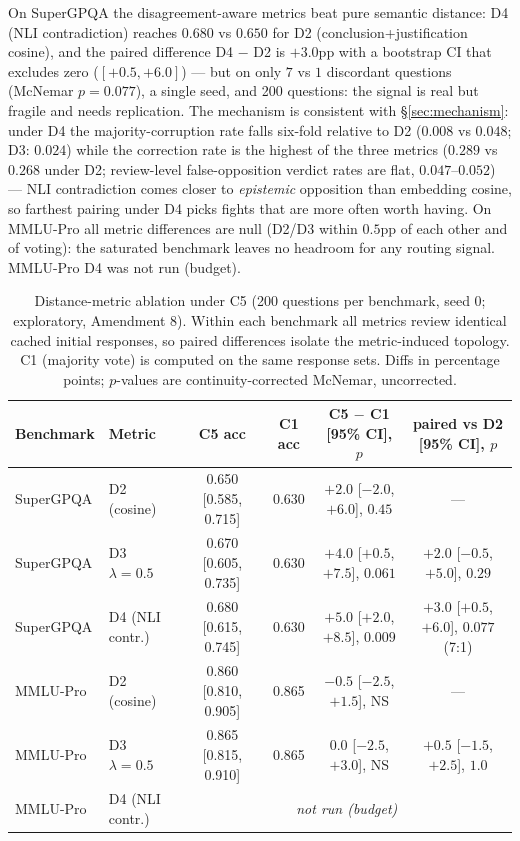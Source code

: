 \documentclass[11pt]{article}
\begin{document}
On SuperGPQA the disagreement-aware metrics beat pure semantic distance: D4 (NLI contradiction) reaches $0.680$ vs $0.650$ for D2 (conclusion+justification cosine), and the paired difference D4 $-$ D2 is $+3.0$pp with a bootstrap CI that excludes zero ($[+0.5, +6.0]$) --- but on only $7$ vs $1$ discordant questions (McNemar $p=0.077$), a single seed, and 200 questions: the signal is real but fragile and needs replication. The mechanism is consistent with \S\ref{sec:mechanism}: under D4 the majority-corruption rate falls six-fold relative to D2 ($0.008$ vs $0.048$; D3: $0.024$) while the correction rate is the highest of the three metrics ($0.289$ vs $0.268$ under D2; review-level false-opposition verdict rates are flat, $0.047$--$0.052$) --- NLI contradiction comes closer to \emph{epistemic} opposition than embedding cosine, so farthest pairing under D4 picks fights that are more often worth having. On MMLU-Pro all metric differences are null (D2/D3 within $0.5$pp of each other and of voting): the saturated benchmark leaves no headroom for any routing signal. MMLU-Pro D4 was not run (budget).

\begin{table}[t]
\centering
\small
\begin{tabular}{llcccc}
\hline
Benchmark & Metric & C5 acc & C1 acc & C5 $-$ C1 [95\% CI], $p$ & paired vs D2 [95\% CI], $p$ \\
\hline
SuperGPQA & D2 (cosine)      & 0.650 [0.585, 0.715] & 0.630 & $+2.0$ [$-2.0$, $+6.0$], $0.45$  & --- \\
SuperGPQA & D3 $\lambda{=}0.5$ & 0.670 [0.605, 0.735] & 0.630 & $+4.0$ [$+0.5$, $+7.5$], $0.061$ & $+2.0$ [$-0.5$, $+5.0$], $0.29$ \\
SuperGPQA & D4 (NLI contr.)  & 0.680 [0.615, 0.745] & 0.630 & $+5.0$ [$+2.0$, $+8.5$], $0.009$ & $+3.0$ [$+0.5$, $+6.0$], $0.077$ (7:1) \\
MMLU-Pro  & D2 (cosine)      & 0.860 [0.810, 0.905] & 0.865 & $-0.5$ [$-2.5$, $+1.5$], NS      & --- \\
MMLU-Pro  & D3 $\lambda{=}0.5$ & 0.865 [0.815, 0.910] & 0.865 & $0.0$ [$-2.5$, $+3.0$], NS       & $+0.5$ [$-1.5$, $+2.5$], $1.0$ \\
MMLU-Pro  & D4 (NLI contr.)  & \multicolumn{4}{c}{\emph{not run (budget)}} \\
\hline
\end{tabular}
\caption{Distance-metric ablation under C5 (200 questions per benchmark, seed 0; exploratory, Amendment 8). Within each benchmark all metrics review identical cached initial responses, so paired differences isolate the metric-induced topology. C1 (majority vote) is computed on the same response sets. Diffs in percentage points; $p$-values are continuity-corrected McNemar, uncorrected.}
\label{tab:dist-ablation}
\end{table}
\end{document}
